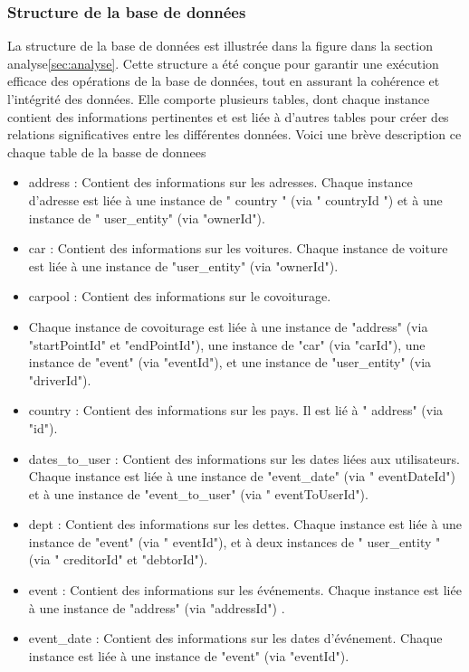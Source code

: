 \subsubsection{Structure de la base de données}
La structure de la base de données est illustrée dans la figure dans la section analyse\ref{sec:analyse}.
Cette structure a été conçue pour garantir une exécution efficace des opérations de la base de données, tout en assurant la cohérence et l'intégrité des données.
Elle comporte plusieurs tables, dont chaque instance contient des informations pertinentes et est liée à d'autres tables pour créer des relations significatives entre les différentes données.
Voici une brève description ce chaque table de la basse de donnees
\begin{itemize}
    \item address : Contient des informations sur les adresses.
    Chaque instance d'adresse est liée à une instance de " country " (via " countryId ") et à une instance de " user\_entity" (via "ownerId").
    \item car : Contient des informations sur les voitures.
    Chaque instance de voiture est liée à une instance de "user\_entity" (via "ownerId").
    \item carpool : Contient des informations sur le covoiturage.
    \item Chaque instance de covoiturage est liée à une instance de "address" (via "startPointId" et "endPointId"), une instance de "car" (via "carId"),
    une instance de "event" (via "eventId"), et une instance de "user\_entity" (via "driverId").
    \item country : Contient des informations sur les pays.
    Il est lié à " address" (via "id").
    \item  dates\_to\_user : Contient des informations sur les dates liées aux utilisateurs.
    Chaque instance est liée à une instance de "event\_date" (via " eventDateId") et à une instance de "event\_to\_user" (via " eventToUserId").
    \item dept : Contient des informations sur les dettes.
    Chaque instance est liée à une instance de "event" (via " eventId"), et à deux instances de " user\_entity " (via " creditorId" et "debtorId").
    \item event : Contient des informations sur les événements.
    Chaque instance est liée à une instance de "address" (via "addressId") .
    \item event\_date : Contient des informations sur les dates d'événement.
    Chaque instance est liée à une instance de "event" (via "eventId").

\end{itemize}
